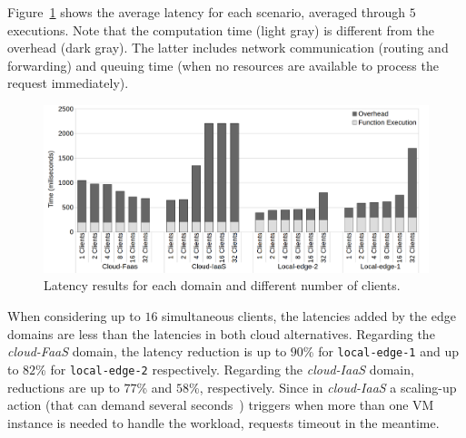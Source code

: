 


 






 Figure~\ref{fig:latency-domains} shows the average latency for each scenario, averaged through $5$ executions. Note that the computation time (light gray) is different from the overhead (dark gray). The latter includes network communication (routing and forwarding) and queuing time (when no resources are available to process the request immediately). 

\begin{figure}
	
	\centering
	\includegraphics[width=1\textwidth]{figs/latency-domains}
	\caption{Latency results for each domain and different number of clients.}
	\label{fig:latency-domains}
\end{figure}

 When considering up to $16$ simultaneous clients, the latencies added by the edge domains are less than the latencies in both cloud alternatives. Regarding the \textit{cloud-FaaS} domain, the latency reduction is up to $90$\% for \texttt{local-edge-1} and up to $82$\% for \texttt{local-edge-2} respectively. Regarding the \textit{cloud-IaaS} domain, reductions are up to $77$\% and $58$\%, respectively. Since in \textit{cloud-IaaS} a scaling-up action (that can demand several seconds~\cite{Quatrocchi2016discrete}) triggers when more than one VM instance is needed to handle the workload, requests timeout in the meantime. 
 
